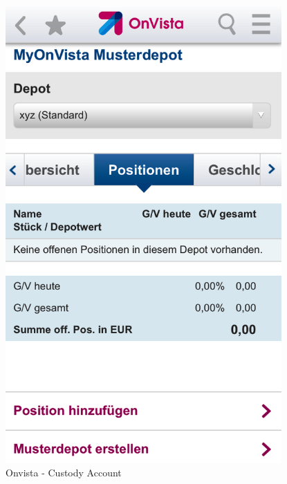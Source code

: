\begin{figure}[H]
\begin{minipage}[b]{.5\linewidth}
        \centering\includegraphics[width=0.94\textwidth]{img/screenshots/ex5p2.png}
    \end{minipage}
	\captionsetup{labelformat=empty}
    \caption[]{Onvista - Custody Account}
\end{figure}
